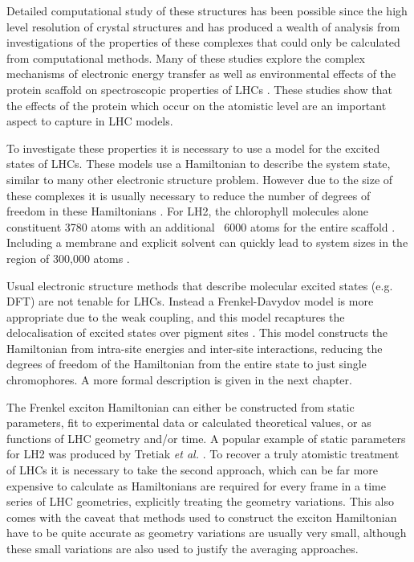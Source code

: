 Detailed computational study of these structures has been possible since the high
level resolution of crystal structures \cite{Mcdermott1995, Koepke1996} and has 
produced a wealth of analysis from investigations of the properties of these complexes
that could only be calculated from computational methods. Many of these studies 
explore the complex mechanisms of electronic energy transfer as well as environmental
effects of the protein scaffold on spectroscopic properties of LHCs \cite{SlaMa2020,
Jang2015, Curutchet2016, Mirkovic2016}. These studies show that the effects of the 
protein which occur on the atomistic level are an important aspect to capture in 
LHC models.

To investigate these properties it is necessary to use a model for the excited states
of LHCs. These models use a Hamiltonian to describe the system state, similar to 
many other electronic structure problem. However due to the size of these complexes
it is usually necessary to reduce the number of degrees of freedom in these Hamiltonians
\cite{Mallus2018, SlaMa2020}. For LH2, the chlorophyll molecules alone constituent
3780 atoms with an additional ~6000 atoms for the entire scaffold \cite{Neugebauer2008, Cherezov2006}.
Including a membrane and explicit solvent can quickly lead to system sizes in the 
region of 300,000 atoms \cite{Mennucci2019}.

Usual electronic structure methods that describe molecular excited states (e.g. 
DFT) are not tenable for LHCs. Instead a Frenkel-Davydov model is more appropriate
due to the weak coupling, and this model recaptures the delocalisation of excited
states over pigment sites \cite{Frenkel1931, Davydov1964}. This model constructs
the Hamiltonian from intra-site energies and inter-site interactions, reducing the
degrees of freedom of the Hamiltonian from the entire state to just single chromophores.
A more formal description is given in the next chapter.

The Frenkel exciton Hamiltonian can either be constructed from static parameters,
fit to experimental data or calculated theoretical values, or as functions of LHC 
geometry and/or time. A popular example of static parameters for LH2 was produced
by Tretiak \emph{et al.} \cite{Tretiak2000}. To recover a truly atomistic treatment
of LHCs it is necessary to take the second approach, which can be far more expensive 
to calculate as Hamiltonians are required for every frame in a time series of LHC 
geometries, explicitly treating the geometry variations. This also comes with the 
caveat that methods used to construct the exciton Hamiltonian have to be quite accurate 
as geometry variations are usually very small, although these small variations are
also used to justify the averaging approaches.

